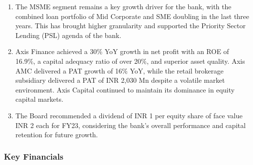 \begin{enumerate}
    \item The MSME segment remains a key growth driver for the bank, with the combined loan portfolio of Mid Corporate and SME doubling in the last three years. This has brought higher granularity and supported the Priority Sector Lending (PSL) agenda of the bank.
    
    \item Axis Finance achieved a 30\% YoY growth in net profit with an ROE of 16.9\%, a capital adequacy ratio of over 20\%, and superior asset quality. Axis AMC delivered a PAT growth of 16\% YoY, while the retail brokerage subsidiary delivered a PAT of INR 2,030 Mn despite a volatile market environment. Axis Capital continued to maintain its dominance in equity capital markets.
    
    \item The Board recommended a dividend of INR 1 per equity share of face value INR 2 each for FY23, considering the bank's overall performance and capital retention for future growth.
\end{enumerate}
\subsubsection{Key Financials}

